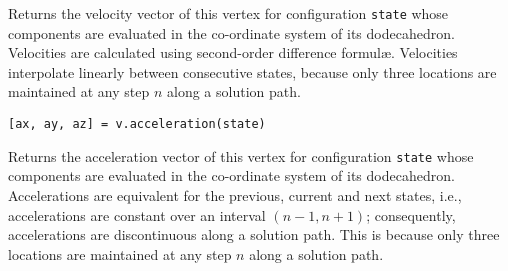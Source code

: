 \medskip\noindent 
Returns the velocity vector of this vertex for configuration \texttt{state} whose components are evaluated in the co-ordinate system of its dodecahedron.  Velocities are calculated using second-order difference formul\ae. Velocities interpolate linearly between consecutive states, because only three locations are maintained at any step $n$ along a solution path.

\medskip\noindent
\texttt{[ax, ay, az] = v.acceleration(state)} 

\medskip\noindent 
Returns the acceleration vector of this vertex for configuration \texttt{state} whose components are evaluated in the co-ordinate system of its dodecahedron.  Accelerations are equivalent for the previous, current and next states, i.e., accelerations are constant over an interval $(n \! - \! 1, n \! + \! 1)$; consequently, accelerations are discontinuous along a solution path.  This is because only three locations are maintained at any step $n$ along a solution path.
